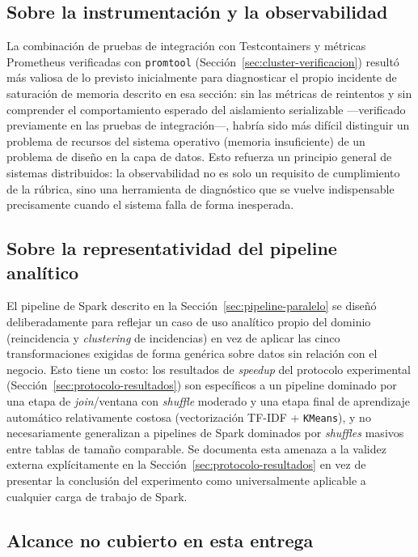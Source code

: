 \subsection{Sobre la instrumentación y la observabilidad}

La combinación de pruebas de integración con Testcontainers y métricas Prometheus verificadas con
\texttt{promtool} (Sección~\ref{sec:cluster-verificacion}) resultó más valiosa de lo previsto
inicialmente para diagnosticar el propio incidente de saturación de memoria descrito en esa
sección: sin las métricas de reintentos y sin comprender el comportamiento esperado del aislamiento
serializable —verificado previamente en las pruebas de integración—, habría sido más difícil
distinguir un problema de recursos del sistema operativo (memoria insuficiente) de un problema de
diseño en la capa de datos. Esto refuerza un principio general de sistemas distribuidos: la
observabilidad no es solo un requisito de cumplimiento de la rúbrica, sino una herramienta de
diagnóstico que se vuelve indispensable precisamente cuando el sistema falla de forma inesperada.

\subsection{Sobre la representatividad del pipeline analítico}

El pipeline de Spark descrito en la Sección~\ref{sec:pipeline-paralelo} se diseñó deliberadamente
para reflejar un caso de uso analítico propio del dominio (reincidencia y \emph{clustering} de
incidencias) en vez de aplicar las cinco transformaciones exigidas de forma genérica sobre datos
sin relación con el negocio. Esto tiene un costo: los resultados de \emph{speedup} del protocolo
experimental (Sección~\ref{sec:protocolo-resultados}) son específicos a un pipeline dominado por
una etapa de \emph{join}/ventana con \emph{shuffle} moderado y una etapa final de aprendizaje
automático relativamente costosa (vectorización TF-IDF + \texttt{KMeans}), y no necesariamente
generalizan a pipelines de Spark dominados por \emph{shuffles} masivos entre tablas de tamaño
comparable. Se documenta esta amenaza a la validez externa explícitamente en la
Sección~\ref{sec:protocolo-resultados} en vez de presentar la conclusión del experimento como
universalmente aplicable a cualquier carga de trabajo de Spark.

\subsection{Alcance no cubierto en esta entrega}

